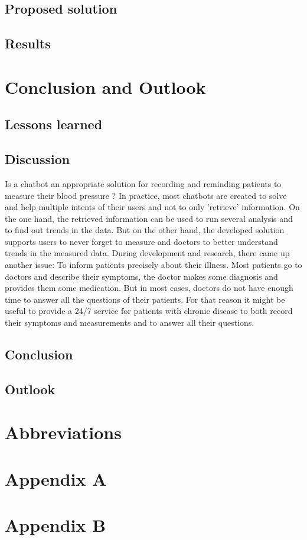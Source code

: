 \section{Proposed solution}\label{proposed_solution}

\section{Results}\label{results}

\chapter{Conclusion and Outlook}\label{conclusion_outlook}
\section{Lessons learned}\label{lessons_learned}

\section{Discussion}\label{discussion}
Is a chatbot an appropriate solution for recording and reminding patients to measure their blood pressure ? 
In practice, most chatbots are created to solve and help multiple intents of their users and not to only 'retrieve' information.
On the one hand, the retrieved information can be used to run several analysis and to find out trends in the data. But on the other hand, the developed solution  supports users to never forget to measure and doctors to better understand trends in the measured data.
During development and research, there came up another issue: To inform patients precisely about their illness. Most patients go to doctors and describe their symptoms, the doctor makes some diagnosis and provides them some medication. But in most cases, doctors do not have enough time to answer all the questions of their patients. For that reason it might be useful to provide a 24/7 service for patients with chronic disease to both record their symptoms and measurements and to answer all their questions.

\section{Conclusion}\label{conclusion}

\section{Outlook}\label{outlook}

\chapter{Abbreviations}

\printbibliography

\chapter{Appendix A}\label{appendix a}

\chapter{Appendix B}\label{appendix b}
%


